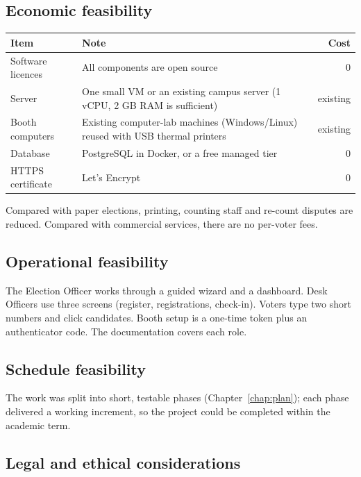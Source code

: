 \subsection{Economic feasibility}

\begin{center}
\begin{tabularx}{\linewidth}{@{}lXr@{}}
\toprule
\textbf{Item} & \textbf{Note} & \textbf{Cost} \\
\midrule
Software licences & All components are open source & 0 \\
Server & One small VM or an existing campus server (1 vCPU, 2 GB RAM is sufficient) & existing \\
Booth computers & Existing computer-lab machines (Windows/Linux) reused with USB thermal printers & existing \\
Database & PostgreSQL in Docker, or a free managed tier & 0 \\
HTTPS certificate & Let's Encrypt & 0 \\
\bottomrule
\end{tabularx}
\end{center}

Compared with paper elections, printing, counting staff and re-count disputes are reduced. Compared with commercial services, there are no per-voter fees.

\subsection{Operational feasibility}

The Election Officer works through a guided wizard and a dashboard. Desk Officers use three screens (register, registrations, check-in). Voters type two short numbers and click candidates. Booth setup is a one-time token plus an authenticator code. The documentation covers each role.

\subsection{Schedule feasibility}

The work was split into short, testable phases (Chapter~\ref{chap:plan}); each phase delivered a working increment, so the project could be completed within the academic term.

\subsection{Legal and ethical considerations}

